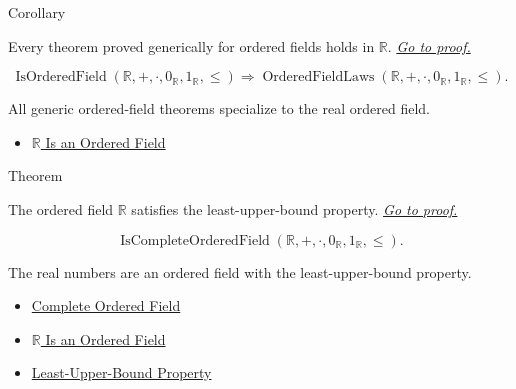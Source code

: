 \begin{corollarybox}{Corollary}
\begin{corollary}
\label{cor:ordered-field-laws-on-r}
Every theorem proved generically for ordered fields holds in $\mathbb{R}$.
\hyperref[prf:ordered-field-laws-on-r]{\textit{Go to proof.}}
\end{corollary}
\end{corollarybox}

\begin{remark*}
\[
\operatorname{IsOrderedField}(\mathbb{R},+,\cdot,0_{\mathbb{R}},1_{\mathbb{R}},\le)
\Longrightarrow
\operatorname{OrderedFieldLaws}(\mathbb{R},+,\cdot,0_{\mathbb{R}},1_{\mathbb{R}},\le).
\]
\end{remark*}

\begin{remark*}[Interpretation]
All generic ordered-field theorems specialize to the real ordered field.
\end{remark*}

\begin{dependencies}
\begin{itemize}
  \item \hyperref[thm:r-is-an-ordered-field]{$\mathbb{R}$ Is an Ordered Field}
\end{itemize}
\end{dependencies}

\begin{theorembox}{Theorem}
\begin{theorem}
\label{thm:r-is-complete-ordered-field}
The ordered field $\mathbb{R}$ satisfies the least-upper-bound property.
\hyperref[prf:r-is-complete-ordered-field]{\textit{Go to proof.}}
\end{theorem}
\end{theorembox}

\begin{remark*}
\[
\operatorname{IsCompleteOrderedField}(\mathbb{R},+,\cdot,0_{\mathbb{R}},1_{\mathbb{R}},\le).
\]
\end{remark*}

\begin{remark*}[Interpretation]
The real numbers are an ordered field with the least-upper-bound property.
\end{remark*}

\begin{dependencies}
\begin{itemize}
  \item \hyperref[def:real-ordered-field]{Complete Ordered Field}
  \item \hyperref[thm:r-is-an-ordered-field]{$\mathbb{R}$ Is an Ordered Field}
  \item \hyperref[thm:lub-property-r]{Least-Upper-Bound Property}
\end{itemize}
\end{dependencies}
